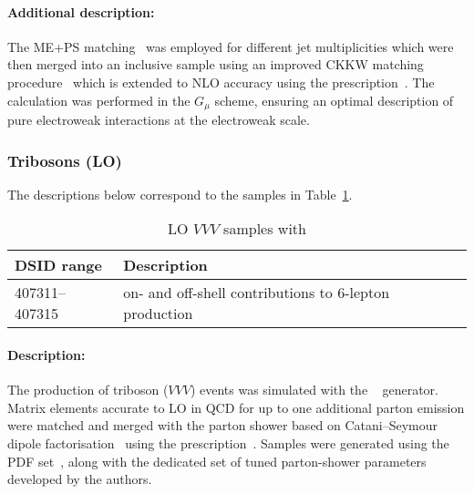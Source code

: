 \paragraph{Additional description:}

The ME+PS matching~\cite{Hoeche:2011fd} was employed for different jet
multiplicities which were then merged into an inclusive sample 
using an improved CKKW matching procedure~\cite{Catani:2001cc,Hoeche:2009rj} which is extended to NLO
accuracy using the \MEPSatNLO prescription~\cite{Hoeche:2012yf}.  The
calculation was performed in the $G_\mu$ scheme, ensuring an optimal description of pure electroweak interactions at the
electroweak scale.






\subsubsection{Tribosons (LO)}

The descriptions below correspond to the samples in
Table~\ref{tab:MB-sherpa-vvvlo}.

\begin{table}[htbp]
  \begin{center}
    \caption{LO $VVV$ samples with \SHERPA }
    \label{tab:MB-sherpa-vvvlo}
    \begin{tabular}{ l | l }
      \hline
      DSID range & Description \\
      \hline
      407311--407315   & on- and off-shell contributions to 6-lepton production\\
      \hline
    \end{tabular}
  \end{center}
\end{table}

\paragraph{Description:}

The production of triboson ($VVV$) events was simulated with the
\SHERPA[2.2.1]~\cite{Bothmann:2019yzt} generator. Matrix elements accurate to LO in QCD 
for up to one additional parton emission were matched and merged with the \SHERPA parton shower based on Catani--Seymour
dipole factorisation~\cite{Gleisberg:2008fv,Schumann:2007mg} using the \MEPSatLO
prescription~\cite{Hoeche:2011fd,Hoeche:2012yf,Catani:2001cc,Hoeche:2009rj}.
Samples were generated using the \NNPDF[3.0nnlo] PDF set~\cite{Ball:2014uwa},
along with the dedicated set of tuned parton-shower parameters
developed by the \SHERPA authors.

